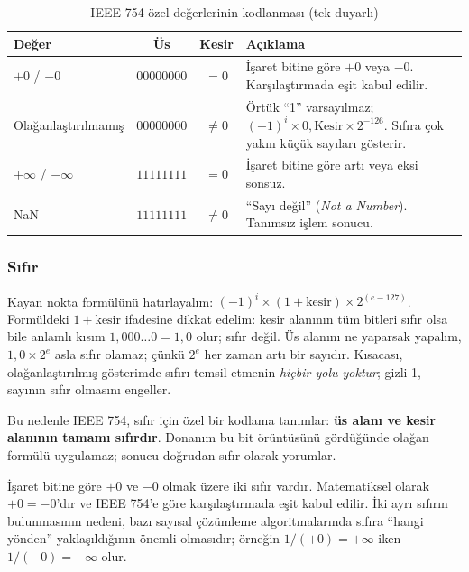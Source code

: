 \begin{table}[htbp]
\centering
\caption{IEEE 754 özel değerlerinin kodlanması (tek duyarlı)}
\label{tab:ozel-degerler-kodlama}
\small
\begin{tabularx}{\textwidth}{l c c X}
\toprule
\textbf{Değer} & \textbf{Üs} & \textbf{Kesir} & \textbf{Açıklama} \\
\midrule
$+0$ / $-0$ & $00000000$ & $= 0$ & İşaret bitine göre $+0$ veya $-0$. Karşılaştırmada eşit kabul edilir. \\[3pt]
Olağanlaştırılmamış\index{olağanlaştırılmamış sayı}\index{denormalized number|see{olağanlaştırılmamış sayı}} & $00000000$ & $\neq 0$ & Örtük ``1'' varsayılmaz; $(-1)^i \times 0{,}\text{Kesir} \times 2^{-126}$. Sıfıra çok yakın küçük sayıları gösterir. \\[3pt]
$+\infty$ / $-\infty$\index{sonsuz}\index{infinity|see{sonsuz}} & $11111111$ & $= 0$ & İşaret bitine göre artı veya eksi sonsuz. \\[3pt]
NaN\index{NaN} & $11111111$ & $\neq 0$ & ``Sayı değil'' (\emph{Not a Number}). Tanımsız işlem sonucu. \\
\bottomrule
\end{tabularx}
\end{table}

\subsubsection{Sıfır}

Kayan nokta formülünü hatırlayalım: $(-1)^i \times (1 + \text{kesir}) \times 2^{(e - 127)}$. Formüldeki $1 + \text{kesir}$ ifadesine dikkat edelim: kesir alanının tüm bitleri sıfır olsa bile anlamlı kısım $1{,}000\ldots0 = 1{,}0$ olur; sıfır değil. Üs alanını ne yaparsak yapalım, $1{,}0 \times 2^e$ asla sıfır olamaz; çünkü $2^e$ her zaman artı bir sayıdır. Kısacası, olağanlaştırılmış gösterimde sıfırı temsil etmenin \emph{hiçbir yolu yoktur}; gizli 1, sayının sıfır olmasını engeller.

Bu nedenle IEEE 754, sıfır için özel bir kodlama tanımlar: \textbf{üs alanı ve kesir alanının tamamı sıfırdır}. Donanım bu bit örüntüsünü gördüğünde olağan formülü uygulamaz; sonucu doğrudan sıfır olarak yorumlar.

İşaret bitine göre $+0$ ve $-0$ olmak üzere iki sıfır vardır. Matematiksel olarak $+0 = -0$'dır ve IEEE 754'e göre karşılaştırmada eşit kabul edilir. İki ayrı sıfırın bulunmasının nedeni, bazı sayısal çözümleme algoritmalarında sıfıra ``hangi yönden'' yaklaşıldığının önemli olmasıdır; örneğin $1 / (+0) = +\infty$ iken $1 / (-0) = -\infty$ olur.

